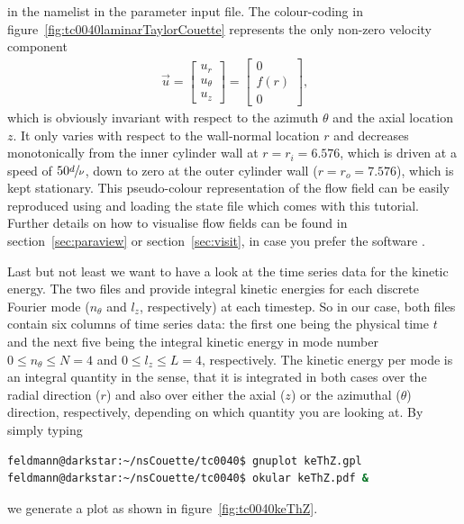 \documentclass[a4paper, 11pt, DIV=11]{scrartcl}
\begin{document}
in the namelist  in the parameter input file.
The colour-coding in figure~\ref{fig:tc0040laminarTaylorCouette} represents
the only non-zero velocity component
\begin{align}
\vec{u}=
\begin{bmatrix}
u_{r}\\ u_{\theta}\\u_{z}
\end{bmatrix}
=
\begin{bmatrix}
0\\ f(r)\\0
\end{bmatrix}
\text{,}
\end{align}
which is obviously invariant with respect to the azimuth $\theta$ and the axial
location $z$. It only varies with respect to the wall-normal location $r$ and
decreases monotonically from the inner cylinder wall at $r=r_{i}=\num{6.576}$,
which is driven at a speed of $\num{50}\sfrac{d}{\nu}$, down to zero at the outer
cylinder wall ($r=r_{o}=\num{7.576}$), which is kept stationary. This pseudo-colour
representation of the flow field can be easily reproduced using  \paraview
and loading the state file  which comes with this
tutorial. Further details on how to visualise flow fields can be found in
section~\ref{sec:paraview} or section~\ref{sec:visit}, in case you prefer the software
\visit.
\par
Last but not least we want to have a look at the time series data for the
kinetic energy. The two files  and  provide integral
kinetic energies for each discrete Fourier mode ($n_{\theta}$ and $l_{z}$,
respectively) at each timestep. So in our case, both files contain six
columns of time series data: the  first one being the physical time $t$ and
the next five being the integral kinetic energy in mode number
$\num{0}\le n_{\theta}\le N=\num{4}$ and $\num{0}\le l_{z}\le L=\num{4}$,
respectively. The kinetic energy per mode is an integral quantity in the sense,
that it is integrated in both cases over the radial direction ($r$) and also
over either the axial ($z$) or the azimuthal ($\theta$) direction, respectively,
depending on which quantity you are looking at.
By simply typing
\begin{lstlisting}[language=bash]
feldmann@darkstar:~/nsCouette/tc0040$ gnuplot keThZ.gpl
feldmann@darkstar:~/nsCouette/tc0040$ okular keThZ.pdf &
\end{lstlisting}
we generate a plot as shown in figure~\ref{fig:tc0040keThZ}.
\end{document}
